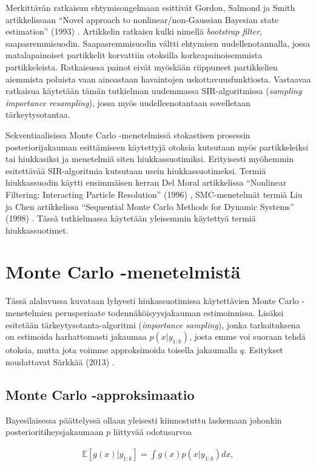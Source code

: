 \documentclass[
  12pt,
  a4paper, twoside]{book}
\begin{document}
Merkittävän ratkaisun ehtymisongelmaan esittivät Gordon, Salmond ja Smith artikkelissaan ``Novel approach to nonlinear/non-Gaussian Bayesian state estimation'' (1993) \citep{Gordon-1993}. Artikkelin ratkaisu kulki nimellä \emph{bootstrap filter}, saapasremmisuodin. Saapasremmisuodin vältti ehtymisen uudellenotannalla, jossa matalapainoiset partikkelit korvattiin otoksilla korkeapainoisemmista partikkeleista. Ratkaisussa painot eivät myöskään riippuneet partikkelien aiemmista poluista vaan ainoastaan havaintojen uskottavuusfunktiosta. Vastaavaa ratkaisua käytetään tämän tutkielman uudemmassa SIR-algoritmissa (\emph{sampling importance resampling}), jossa myös uudelleenotantaan sovelletaan tärkeytysotantaa.

Sekventiaalisissa Monte Carlo -menetelmissä stokastisen prosessin posteriorijakauman esittämiseen käytettyjä otoksia kutsutaan myös partikkeleiksi tai hiukkasiksi ja menetelmiä siten hiukkassuotimiksi. Erityisesti myöhemmin esitettävää SIR-algoritmia kutsutaan usein hiukkassuotimeksi. Termiä hiukkassuodin käytti ensimmäisen kerran Del Moral artikkelissa ``Nonlinear Filtering: Interacting Particle Resolution'' (1996) \citep{DelMoral-1996}, SMC-menetelmät termiä Liu ja Chen artikkelissa ``Sequential Monte Carlo Methods for Dynamic Systems'' (1998) \citep{Liu-1998}. Tässä tutkielmassa käytetään yleisemmin käytettyä termiä hiukkassuotimet.

\section{Monte Carlo -menetelmistä}

Tässä alaluvussa kuvataan lyhyesti hiukassuotimissa käytettävien Monte Carlo -menetelmien perusperiaate todennäköisyysjakauman estimoinnissa. Lisäksi esitetään tärkeytysotanta-algoritmi (\emph{importance sampling}), jonka tarkoituksena on estimoida harhattomasti jakaumaa \(p(x|y_{1:k})\), josta emme voi suoraan tehdä otoksia, mutta jota voimme approksimoida toisella jakaumalla \(q\). Esitykset noudattavat Särkkää (2013) \citep{sarkka-2013}.

\subsection{Monte Carlo -approksimaatio}

Bayesilaisessa päättelyssä ollaan yleisesti kiinnostuttu laskemaan johonkin posterioritiheysjakaumaan \(p\) liittyvää odotusarvoa

\begin{align}
\mathbb{E}[g(x)|y_{1:k}]=\int g(x)p(x|y_{1:k})dx,
\end{align}
\end{document}
